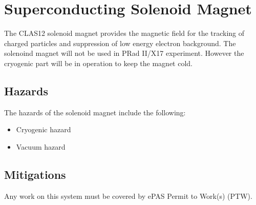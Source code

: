 \section{Superconducting Solenoid Magnet}

The CLAS12 solenoid magnet provides the magnetic field for the tracking of charged 
particles and suppression of low energy electron background. The solenoind magnet will not be used in PRad II/X17 experiment. However the cryogenic part will be in operation to keep the magnet cold.

\subsection{Hazards} 

The hazards of the solenoid magnet include the following:

\begin{itemize}
\item Cryogenic hazard
\item Vacuum hazard
\end{itemize}

\subsection{Mitigations}
Any work on this system must be covered by ePAS Permit to Work(s) (PTW).

%

